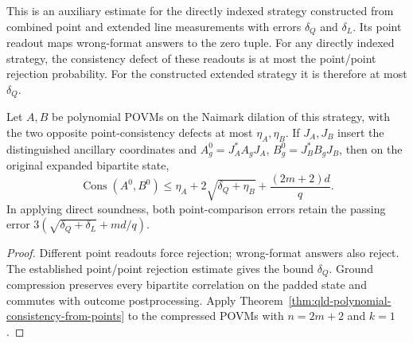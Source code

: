 \begin{theorem}
\label{thm:qld-compressed-polynomial-consistency}
\leanok
This is an auxiliary estimate for the directly indexed strategy constructed
from combined point and extended line measurements with errors $\delta_Q$
and $\delta_L$. Its point readout maps wrong-format answers to the zero tuple.
For any directly indexed strategy, the consistency defect of these readouts
is at most the point/point rejection probability. For the constructed
extended strategy it is therefore at most $\delta_Q$.

Let $A,B$ be polynomial POVMs on the Naimark dilation of this strategy,
with the two opposite point-consistency defects at most $\eta_A,\eta_B$.
If $J_A,J_B$ insert the distinguished ancillary coordinates and
$A_g^0=J_A^*A_gJ_A$, $B_g^0=J_B^*B_gJ_B$, then on the original expanded
bipartite state,
\[
\operatorname{Cons}(A^0,B^0)
\leq\eta_A+2\sqrt{\delta_Q+\eta_B}+\frac{(2m+2)d}{q}.
\]
In applying direct soundness, both point-comparison errors retain the
passing error $3(\sqrt{\delta_Q+\delta_L}+md/q)$.
\end{theorem}
\begin{proof}
\leanok
{}
Different point readouts force rejection; wrong-format answers also reject.
The established point/point rejection estimate gives the bound $\delta_Q$.
Ground compression preserves every bipartite correlation on the padded state
and commutes with outcome postprocessing. Apply
Theorem~\ref{thm:qld-polynomial-consistency-from-points} to the compressed
POVMs with $n=2m+2$ and $k=1$.
\end{proof}

